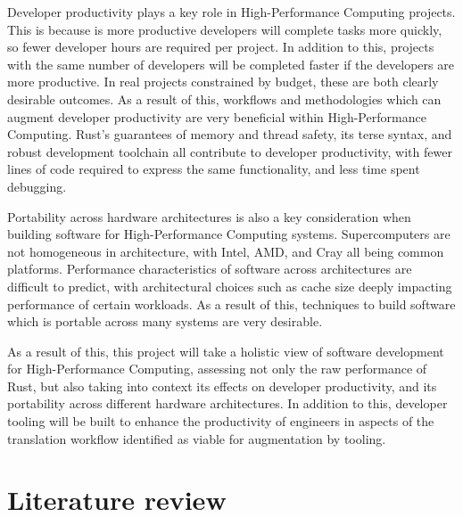Developer productivity plays a key role in High-Performance Computing projects. This is because is more productive developers will complete tasks more quickly, so fewer developer hours are required per project. In addition to this, projects with the same number of developers will be completed faster if the developers are more productive. In real projects constrained by budget, these are both clearly desirable outcomes. As a result of this, workflows and methodologies which can augment developer productivity are very beneficial within High-Performance Computing. Rust's guarantees of memory and thread safety, its terse syntax, and robust development toolchain all contribute to developer productivity, with fewer lines of code required to express the same functionality, and less time spent debugging.

Portability across hardware architectures is also a key consideration when building software for High-Performance Computing systems. Supercomputers are not homogeneous in architecture, with Intel, AMD, and Cray all being common platforms. Performance characteristics of software across architectures are difficult to predict, with architectural choices such as cache size deeply impacting performance of certain workloads. As a result of this, techniques to build software which is portable across many systems are very desirable.

As a result of this, this project will take a holistic view of software development for High-Performance Computing, assessing not only the raw performance of Rust, but also taking into context its effects on developer productivity, and its portability across different hardware architectures. In addition to this, developer tooling will be built to enhance the productivity of engineers in aspects of the translation workflow identified as viable for augmentation by tooling.


\section{Literature review} %
\label{sec:literature-review}


